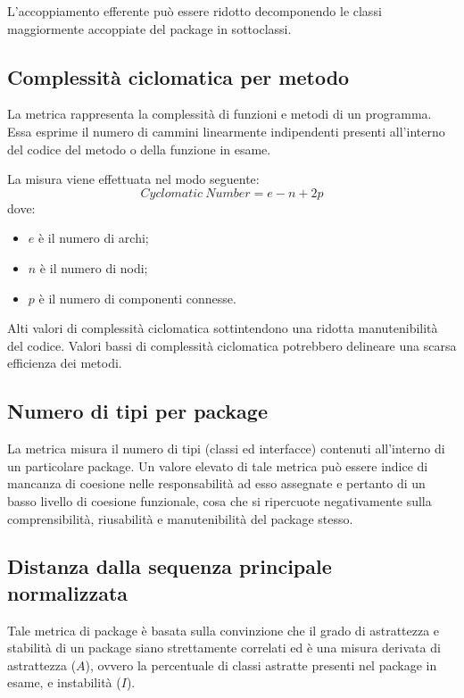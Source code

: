 L'accoppiamento efferente può essere ridotto decomponendo le classi maggiormente accoppiate del package in sottoclassi.



\subsection{Complessità ciclomatica per metodo}
La metrica rappresenta la complessità di funzioni e metodi di un programma. Essa esprime il numero di cammini linearmente indipendenti presenti all'interno del codice del metodo o della funzione in esame. 

La misura viene effettuata nel modo seguente:
\begin{equation}
	Cyclomatic \ Number = e - n + 2p
\end{equation}
dove:
\begin{itemize}
	\item $e$ è il numero di archi;
	\item $n$ è il numero di nodi;
	\item $p$ è il numero di componenti connesse.
\end{itemize}
Alti valori di complessità ciclomatica sottintendono una ridotta manutenibilità del codice. Valori bassi di complessità ciclomatica potrebbero delineare una scarsa efficienza dei metodi.



\subsection{Numero di tipi per package}
La metrica misura il numero di tipi (classi ed interfacce) contenuti all'interno di un particolare package. Un valore elevato di tale metrica può essere indice di mancanza di coesione nelle responsabilità ad esso assegnate e pertanto di un basso livello di coesione funzionale, cosa che si ripercuote negativamente sulla comprensibilità, riusabilità e manutenibilità del package stesso. 



\subsection{Distanza dalla sequenza principale normalizzata} 
Tale metrica di package è basata sulla convinzione che il grado di astrattezza e stabilità di un package siano strettamente correlati ed è una misura derivata di astrattezza ($A$), ovvero la percentuale di classi astratte presenti nel package in esame, e instabilità ($I$). 

